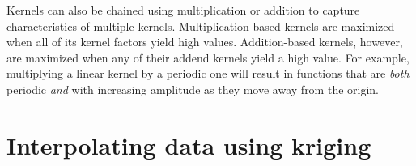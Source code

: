 Kernels can also be chained using multiplication or addition to capture characteristics of multiple kernels.
Multiplication-based kernels are maximized when all of its kernel factors yield high values.
Addition-based kernels, however, are maximized when any of their addend kernels yield a high value.
For example, multiplying a linear kernel by a periodic one will result in functions that are \textit{both} periodic \textit{and} with increasing amplitude as they move away from the origin.


\section{Interpolating data using kriging}
\label{sec:interploating_data_using_kriging}

\citet{Galvez2020unifiying} %
\citet{Kousidis2008towards} %

